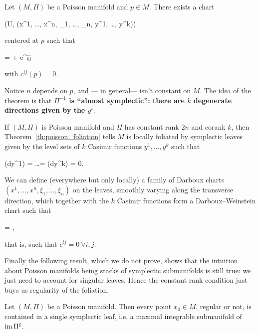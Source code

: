 \documentclass[main.tex]{subfiles}
\begin{document}
\begin{theorem}
\label{th:darboux_weinstein}
	Let $(M, \Pi)$ be a Poisson manifold and $p \in M$. There exists a chart
	\begin{eqalign}
		(U, (x^1, \ldots, x^n, \xi_1, \ldots, \xi_n, y^1, \ldots, y^k))
	\end{eqalign}
	centered at $p$ such that
	\begin{eqalign}
		\Pi =  \wedge {} +  c^{ij}  \wedge \pder{}{y^j}
	\end{eqalign}
	with $c^{ij}(p) = 0$.
\end{theorem}

Notice $n$ depends on $p$, and --- in general--- isn't constant on $M$. The idea of the theorem is that \textbf{$\Pi^{-1}$ is ``almost symplectic'': there are $k$ degenerate directions given by the $y^i$}.

\begin{remark}
	If $(M, \Pi)$ is Poisson manifold and $\Pi$ has constant rank $2n$ and corank $k$, then Theorem~\ref{th:poisson_foliation} tells $M$ is locally foliated by symplectic leaves given by the level sets of $k$ Casimir functions $y^1, \ldots, y^k$ such that
	\begin{eqalign}
		\Pi(dy^1) = \ldots = \Pi(dy^k) = 0.
	\end{eqalign}
	We can define (everywhere but only locally) a family of Darboux charts $(x^1, \ldots, x^n, \xi_1, \ldots, \xi_n)$ on the leaves, smoothly varying along the transverse direction, which together with the $k$ Casimir functions form a Darboux--Weinstein chart such that
	\begin{eqalign}
		\Pi =  \wedge \pder{}{\xi_i},
	\end{eqalign}
	that is, such that $c^{ij} = 0\ \forall i,j$.
\end{remark}

Finally the following result, which we do not prove, shows that the intuition about Poisson manifolds being stacks of symplectic submanifolds is still true: we just need to account for singular leaves. Hence the constant rank condition just buys us regularity of the foliation.

\begin{theorem}
	Let $(M, \Pi)$ be a Poisson manifold. Then every point $x_0 \in M$, regular or not, is contained in a single symplectic leaf, i.e. a maximal integrable submanifold of $\operatorname{im} \Pi^\sharp$.
\end{theorem}
\end{document}
